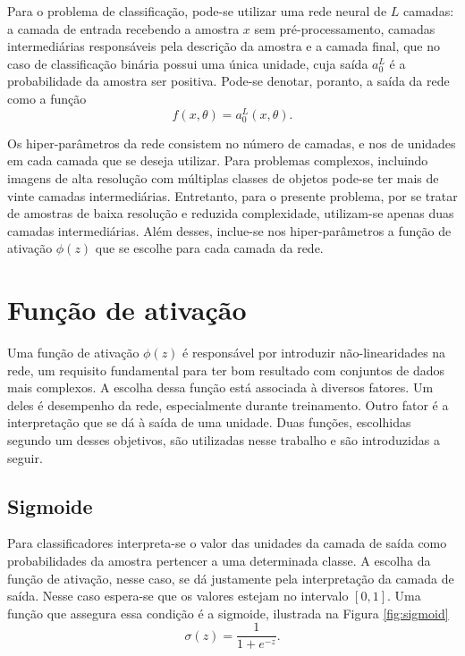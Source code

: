 Para o problema de classificação, pode-se utilizar uma rede neural de $L$ camadas: a camada de entrada recebendo a amostra $x$ sem pré-processamento, camadas intermediárias responsáveis pela descrição da amostra e a camada final, que no caso de classificação binária possui uma única unidade, cuja saída $a^L_0$ é a probabilidade da amostra ser positiva. Pode-se denotar, poranto, a saída da rede como a função
\begin{equation}
f(x, \theta) = a^L_0(x, \theta).
\end{equation}

Os hiper-parâmetros da rede consistem no número de camadas, e nos de unidades em cada camada que se deseja utilizar. Para problemas complexos, incluindo imagens de alta resolução com múltiplas classes de objetos pode-se ter mais de vinte camadas intermediárias. Entretanto, para o presente problema, por se tratar de amostras de baixa resolução e reduzida complexidade, utilizam-se apenas duas camadas intermediárias. Além desses, inclue-se nos hiper-parâmetros a função de ativação $\phi(z)$ que se escolhe para cada camada da rede.

\section{Função de ativação}
\label{sec:funcao-ativacao}
Uma função de ativação $\phi(z)$ é responsável por introduzir não-linearidades na rede, um requisito fundamental para ter bom resultado com conjuntos de dados mais complexos. A escolha dessa função está associada à diversos fatores. Um deles é desempenho da rede, especialmente durante treinamento. Outro fator é a interpretação que se dá à saída de uma unidade. Duas funções, escolhidas segundo um desses objetivos, são utilizadas nesse trabalho e são introduzidas a seguir.

\subsection{Sigmoide}
Para classificadores interpreta-se o valor das unidades da camada de saída como probabilidades da amostra pertencer a uma determinada classe. A escolha da função de ativação, nesse caso, se dá justamente pela interpretação da camada de saída. Nesse caso espera-se que os valores estejam no intervalo $[0,1]$. Uma função que assegura essa condição é a sigmoide, ilustrada na Figura \ref{fig:sigmoid}
\begin{equation}
	\label{eq:sigm}
	\sigma(z) = \frac{1}{1+e^{-z}}.
\end{equation}

